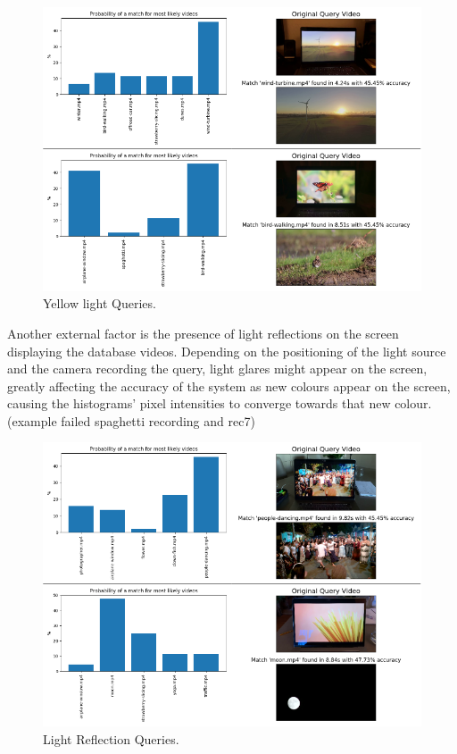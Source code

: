 \begin{figure}[h] 
\centerline{\includegraphics[width=\textwidth]{figures/evaluation/yellow-light-queries.png}}
\caption{\label{fig:evaluation-yellow-light-queries}Yellow light Queries.}
\end{figure}

Another external factor is the presence of light reflections on the screen displaying the database videos. Depending on the positioning of the light source and the camera recording the query, light glares might appear on the screen, greatly affecting the accuracy of the system as new colours appear on the screen, causing the histograms' pixel intensities to converge towards that new colour. (example failed spaghetti recording and rec7)

\begin{figure}[h] 
\centerline{\includegraphics[width=\textwidth]{figures/evaluation/light-reflection-queries.png}}
\caption{\label{fig:evaluation-light-reflection-queries}Light Reflection Queries.}
\end{figure}

